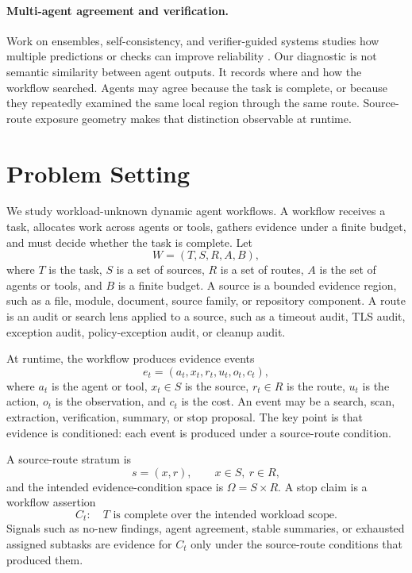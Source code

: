\documentclass[letterpaper,10pt,twocolumn]{article}
\begin{document}
\paragraph{Multi-agent agreement and verification.}
Work on ensembles, self-consistency, and verifier-guided systems studies how
multiple predictions or checks can improve reliability
\citep{dietterich2000ensemble,cobbe2021training,wang2023selfconsistency}. Our
diagnostic is not semantic similarity between agent outputs. It records where
and how the workflow searched. Agents may agree because the task is complete, or
because they repeatedly examined the same local region through the same route.
Source-route exposure geometry makes that distinction observable at runtime.

\section{Problem Setting}

We study workload-unknown dynamic agent workflows. A workflow receives a task,
allocates work across agents or tools, gathers evidence under a finite budget,
and must decide whether the task is complete. Let
\[
W=(T,S,R,A,B),
\]
where \(T\) is the task, \(S\) is a set of sources, \(R\) is a set of routes,
\(A\) is the set of agents or tools, and \(B\) is a finite budget. A source is a
bounded evidence region, such as a file, module, document, source family, or
repository component. A route is an audit or search lens applied to a source,
such as a timeout audit, TLS audit, exception audit, policy-exception audit, or
cleanup audit.

At runtime, the workflow produces evidence events
\[
e_t=(a_t, x_t, r_t, u_t, o_t, c_t),
\]
where \(a_t\) is the agent or tool, \(x_t\in S\) is the source, \(r_t\in R\) is
the route, \(u_t\) is the action, \(o_t\) is the observation, and \(c_t\) is the
cost. An event may be a search, scan, extraction, verification, summary, or stop
proposal. The key point is that evidence is conditioned: each event is produced
under a source-route condition.

A source-route stratum is
\[
s=(x,r), \qquad x\in S,~r\in R,
\]
and the intended evidence-condition space is \(\Omega=S\times R\). A stop claim
is a workflow assertion
\[
C_t:\quad T \text{ is complete over the intended workload scope.}
\]
Signals such as no-new findings, agent agreement, stable summaries, or exhausted
assigned subtasks are evidence for \(C_t\) only under the source-route conditions
that produced them.
\end{document}
